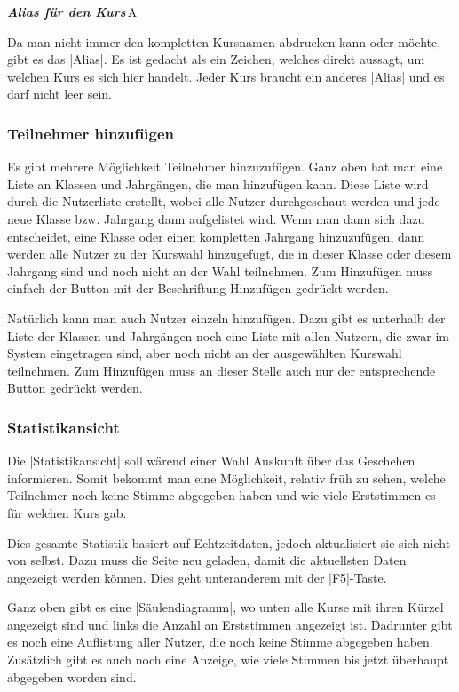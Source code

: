 \documentclass[ngerman]{ltxdoc}
\newcommand{\DescribeOption}[4]{
  \DescribeMacro{#1}
  \begin{minipage}[t]{\textwidth}
    \textit{\textbf{\textcolor{mLightGreen}{#2}}}\dotfill\,#3\par
    \begingroup
    \vspace{0.5em}#4\par
    \endgroup
  \end{minipage}
}
\begin{document}
\DescribeOption{Alias}{Alias für den Kurs}{A}{
  Da man nicht immer den kompletten Kursnamen abdrucken kann oder möchte, gibt es
  das |Alias|. Es ist gedacht als ein Zeichen, welches direkt aussagt, um welchen
  Kurs es sich hier handelt. Jeder Kurs braucht ein anderes |Alias| und es darf
  nicht leer sein.
}

\subsubsection{Teilnehmer hinzufügen}

Es gibt mehrere Möglichkeit Teilnehmer hinzuzufügen. Ganz oben hat man eine Liste
an Klassen und Jahrgängen, die man hinzufügen kann. Diese Liste wird durch die
Nutzerliste erstellt, wobei alle Nutzer durchgeschaut werden und jede neue Klasse
bzw. Jahrgang dann aufgelistet wird. Wenn man dann sich dazu entscheidet, eine Klasse
oder einen kompletten Jahrgang hinzuzufügen, dann werden alle Nutzer zu der Kurswahl
hinzugefügt, die in dieser Klasse oder diesem Jahrgang sind und noch nicht an der Wahl
teilnehmen. Zum Hinzufügen muss einfach der Button mit der Beschriftung \glqq Hinzufügen\grqq
gedrückt werden.

Natürlich kann man auch Nutzer einzeln hinzufügen. Dazu gibt es unterhalb der Liste
der Klassen und Jahrgängen noch eine Liste mit allen Nutzern, die zwar im System
eingetragen sind, aber noch nicht an der ausgewählten Kurswahl teilnehmen. Zum Hinzufügen
muss an dieser Stelle auch nur der entsprechende Button gedrückt werden.

\subsubsection{Statistikansicht}

Die |Statistikansicht| soll wärend einer Wahl Auskunft über das Geschehen informieren.
Somit bekommt man eine Möglichkeit, relativ früh zu sehen, welche Teilnehmer noch
keine Stimme abgegeben haben und wie viele Erststimmen es für welchen Kurs gab.

Dies gesamte Statistik basiert auf Echtzeitdaten, jedoch aktualisiert sie sich
nicht von selbst. Dazu muss die Seite neu geladen, damit die aktuellsten Daten
angezeigt werden können. Dies geht unteranderem mit der |F5|-Taste.

Ganz oben gibt es eine |Säulendiagramm|, wo unten alle Kurse mit ihren Kürzel
angezeigt sind und links die Anzahl an Erststimmen angezeigt ist. Dadrunter gibt
es noch eine Auflistung aller Nutzer, die noch keine Stimme abgegeben haben. Zusätzlich
gibt es auch noch eine Anzeige, wie viele Stimmen bis jetzt überhaupt abgegeben worden
sind.
\end{document}
